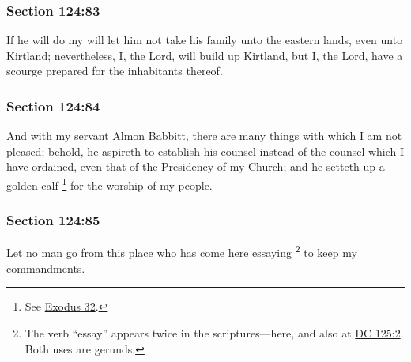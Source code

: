 	\subsubsection{Section 124:83} %
		\label{DC124-83}

		If he will do my will let him not take his family unto the eastern lands, even unto Kirtland; nevertheless, I, the Lord, will build up Kirtland, but I, the Lord, have a scourge prepared for the inhabitants thereof.


	\subsubsection{Section 124:84} %
		\label{DC124-84}

		And with my servant Almon Babbitt, there are many things with which I am not pleased; behold, he aspireth to establish his counsel instead of the counsel which I have ordained, even that of the Presidency of my Church; and he setteth up a golden calf%
			\footnote{%
				See \hyperref[EXODUS-32]{Exodus 32}.
				}
		for the worship of my people.


	\subsubsection{Section 124:85} %
		\label{DC124-85}

		Let no man go from this place who has come here \hyperref[ESSAY]{essaying}%
			\footnote{%
				The verb ``essay'' appears twice in the scriptures---here, and also at \hyperref[DC125-2]{DC 125:2}. Both uses are gerunds.
				}
		to keep my commandments.

